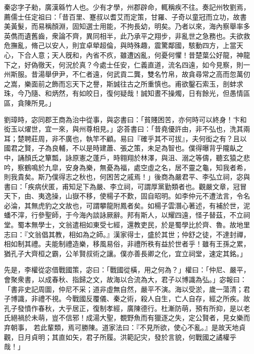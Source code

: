 \begin{pinyinscope}
 
 
 秦宓字子勑，廣漢緜竹人也。少有才學，州郡辟命，輒稱疾不往。奏記州牧劉焉，薦儒士任定祖曰：「昔百里、蹇叔以耆艾而定策，甘羅、子奇以童冠而立功，故書美黃髮，而易稱顏淵，固知選士用能，不拘長幼，明矣。乃者以來，海內察舉率多英儁而遺舊齒，衆論不齊，異同相半，此乃承平之翔步，非亂世之急務也。夫欲救危撫亂，脩己以安人，則宜卓犖超倫，與時殊趣，震驚鄰國，駭動四方，上當天心，下合人意；天人旣和，內省不疚，雖遭凶亂，何憂何懼！昔楚葉公好龍，神龍下之，好偽徹天，何況於真？今處士任安，仁義直道，流名四遠，如今見察，則一州斯服。昔湯舉伊尹，不仁者遠，何武貢二龔，雙名竹帛，故貪尋常之高而忽萬仞之嵩，樂面前之飾而忘天下之譽，斯誠往古之所重慎也。甫欲鑿石索玉，剖蚌求珠，今乃隨、和炳然，有如皎日，復何疑哉！誠知晝不操燭，日有餘光，但愚情區區，貪陳所見。」
 
 
 
 
 
 
 劉璋時，宓同郡王商為治中從事，與宓書曰：「貧賤困苦，亦何時可以終身！卞和衒玉以燿世，宜一來，與州尊相見。」宓荅書曰：「昔堯優許由，非不弘也，洗其兩耳；楚聘莊周，非不廣也，執竿不顧。易曰『確乎其不可拔』，夫何衒之有？且以國君之賢，子為良輔，不以是時建蕭、張之策，未足為智也。僕得曝背乎隴畒之中，誦顏氏之簞瓢，詠原憲之蓬戶，時翱翔於林澤，與沮、溺之等儔，聽玄猿之悲吟，察鶴鳴於九皐，安身為樂，無憂為福，處空虛之名，居不靈之龜，知我者希，則我貴矣。斯乃僕得志之秋也，何困苦之戚焉！」後商為嚴君平、李弘立祠，宓與書曰：「疾病伏匿，甫知足下為嚴、李立祠，可謂厚黨勤類者也。觀嚴文章，冠冒天下，由、夷逸操，山嶽不移，使楊子不歎，固自昭明。如李仲元不遭法言，令名必淪，其無虎豹之文故也，可謂攀龍附鳳者矣。如楊子雲潛心著述，有補於世，泥蟠不滓，行參聖師，于今海內談詠厥辭。邦有斯人，以耀四遠，怪子替茲，不立祠堂。蜀本無學士，文翁遣相如東受七經，還教吏民，於是蜀學比於齊、魯。故地里志曰：『文翁倡其教，相如為之師。』漢家得士，盛於其世；仲舒之徒，不達封禪，相如制其禮。夫能制禮造樂，移風易俗，非禮所秩有益於世者乎！雖有王孫之累，猶孔子大齊桓之霸，公羊賢叔術之讓。僕亦善長卿之化，宜立祠堂，速定其銘。」
 
 
先是，李權從宓借戰國策，宓曰：「戰國從橫，用之何為？」權曰：「仲尼、嚴平，會聚衆書，以成春秋、指歸之文，故海以合流為大，君子以博識為弘。」宓報曰：「書非史記周圖，仲尼不采；道非虛無自然，嚴平不演。海以受淤，歲一蕩清；君子博識，非禮不視。今戰國反覆儀、秦之術，殺人自生，亡人自存，經之所疾。故孔子發憤作春秋，大乎居正，復制孝經，廣陳德行。杜漸防萌，預有所抑，是以老氏絕禍於未萌，豈不信邪！成湯大聖，覩野魚而有獵逐之失，定公賢者，見女樂而弃朝事，
 若此輩類，焉可勝陳。道家法曰：『不見所欲，使心不亂。』是故天地貞觀，日月貞明；其直如矢，君子所履。洪範記灾，發於言貌，何戰國之譎權乎哉！」
 

\end{pinyinscope}

